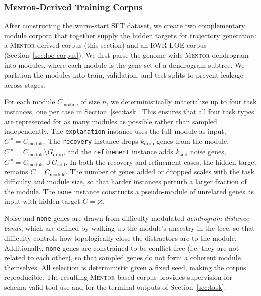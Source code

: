 \documentclass[thesis,letterpaper,12pt]{utthesis}
\begin{document}
\subsubsection{\textsc{Mentor}-Derived Training Corpus}\label{sec:mentor-corpus}
After constructing the warm-start SFT dataset, we create two complementary module corpora that together supply the hidden targets for trajectory generation: a \textsc{Mentor}-derived corpus (this section) and an RWR-LOE corpus (Section~\ref{sec:loe-corpus}). We first parse the genome-wide \textsc{Mentor} dendrogram into modules, where each module is the gene set of a dendrogram subtree. We partition the modules into train, validation, and test splits to prevent leakage across stages.

For each module $C_{\text{module}}$ of size $n$, we deterministically materialize up to four task instances, one per case in Section~\ref{sec:task}. This ensures that all four task types are represented for as many modules as possible rather than sampled independently. The \texttt{explanation} instance uses the full module as input, $C^{\text{in}} = C_{\text{module}}$. The \texttt{recovery} instance drops $k_{\text{drop}}$ genes from the module, $C^{\text{in}} = C_{\text{module}} \setminus G_{\text{drop}}$, and the \texttt{refinement} instance adds $k_{\text{add}}$ noise genes, $C^{\text{in}} = C_{\text{module}} \cup G_{\text{add}}$. In both the recovery and refinement cases, the hidden target remains $C = C_{\text{module}}$. The number of genes added or dropped scales with the task difficulty and module size, so that harder instances perturb a larger fraction of the module. The \texttt{none} instance constructs a pseudo-module of unrelated genes as input with hidden target $C = \varnothing$.

Noise and \texttt{none} genes are drawn from difficulty-modulated \textit{dendrogram distance bands}, which are defined by walking up the module's ancestry in the tree, so that difficulty controls how topologically close the distractors are to the module. Additionally, \texttt{none} genes are constrained to be conflict-free (i.e. they are not related to each other), so that sampled genes do not form a coherent module themselves. All selection is deterministic given a fixed seed, making the corpus reproducible. The resulting \textsc{Mentor}-based corpus provides supervision for schema-valid tool use and for the terminal outputs of Section~\ref{sec:task}.
\end{document}
